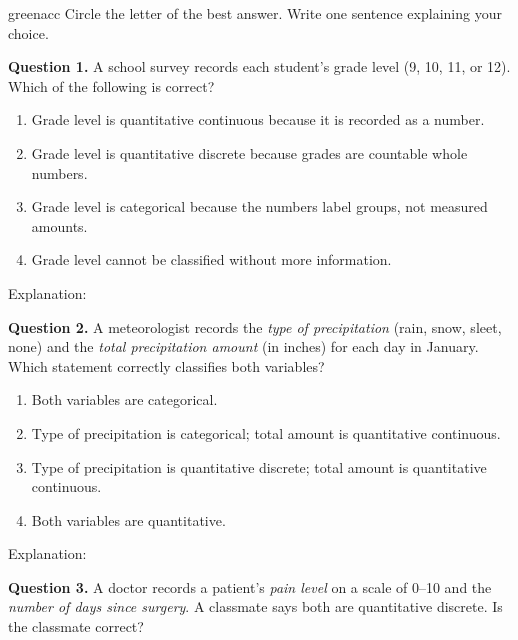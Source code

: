 \documentclass[10pt]{article}
\begin{document}
\vspace{0.14in}

\begin{blurbbox}{greenacc}
\small Circle the letter of the best answer. Write one sentence explaining your choice.

\vspace{10pt}
\textbf{Question 1.}\enspace
A school survey records each student's grade level (9, 10, 11, or 12).
Which of the following is correct?

\begin{enumerate}[label=\textbf{(\Alph*)}, leftmargin=2em, itemsep=4pt]
  \item Grade level is quantitative continuous because it is recorded as a number.
  \item Grade level is quantitative discrete because grades are countable whole numbers.
  \item Grade level is categorical because the numbers label groups, not measured amounts.
  \item Grade level cannot be classified without more information.
\end{enumerate}
\textcolor{slate}{\scriptsize Explanation:}\;\writeline

\vspace{12pt}
\textbf{Question 2.}\enspace
A meteorologist records the \textit{type of precipitation} (rain, snow, sleet, none) and
the \textit{total precipitation amount} (in inches) for each day in January.
Which statement correctly classifies both variables?

\begin{enumerate}[label=\textbf{(\Alph*)}, leftmargin=2em, itemsep=4pt]
  \item Both variables are categorical.
  \item Type of precipitation is categorical; total amount is quantitative continuous.
  \item Type of precipitation is quantitative discrete; total amount is quantitative continuous.
  \item Both variables are quantitative.
\end{enumerate}
\textcolor{slate}{\scriptsize Explanation:}\;\writeline

\vspace{12pt}
\textbf{Question 3.}\enspace
A doctor records a patient's \textit{pain level} on a scale of 0--10 and the
\textit{number of days since surgery}. A classmate says both are quantitative discrete.
Is the classmate correct?


\end{blurbbox}
\end{document}
